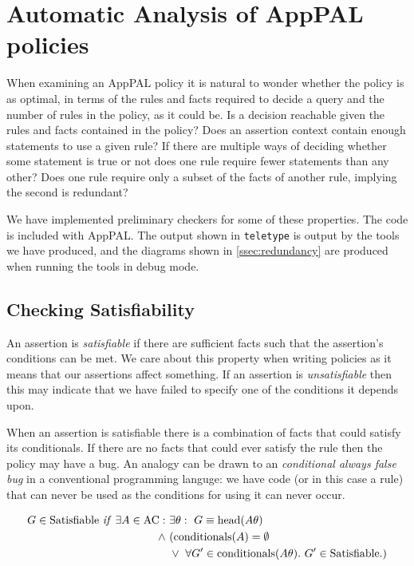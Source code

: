 \documentclass[thesis.tex]{subfiles}
\begin{document}
\section{Automatic Analysis of AppPAL policies}
\label{sec:lint}

When examining an AppPAL policy it is natural to wonder whether the
policy is as optimal, in terms of the rules and facts required to
decide a query and the number of rules in the policy, as it could
be. Is a decision reachable given the rules and facts contained in the
policy?  Does an assertion context contain enough statements to use a
given rule? If there are multiple ways of deciding whether some
statement is true or not does one rule require fewer statements than
any other? Does one rule require only a subset of the facts of another
rule, implying the second is redundant?

We have implemented preliminary checkers for some of these properties. The code
is included with AppPAL. The output shown in \texttt{teletype} is output by the
tools we have produced, and the diagrams shown in \autoref{ssec:redundancy} are
produced when running the tools in debug mode.


\subsection{Checking Satisfiability}

An assertion is \emph{satisfiable} if there are sufficient facts
such that the assertion's conditions can be met.  We care about this
property when writing policies as it means that our assertions affect
something.  If an assertion is \emph{unsatisfiable} then this may
indicate that we have failed to specify one of the conditions it
depends upon.

When an assertion is satisfiable there is a combination of facts that could
satisfy its conditionals. If there are no facts that could ever satisfy the rule
then the policy may have a bug. An analogy can be drawn to an \emph{conditional
always false bug} in a conventional programming languge: we have code (or in
this case a rule) that can never be used as the conditions for using it can
never occur.

\begin{align*}
  G \in \text{Satisfiable}~\text{\textit{if}}~\exists A \in \text{AC}:~&\exists \theta:~G\equiv\text{head}(A\theta) \\
                                                              \wedge~ & (\text{conditionals}(A) = \emptyset \\
                                                                      & \vee~\forall G^\prime \in \text{conditionals}(A\theta).~G^\prime \in \text{Satisfiable}.)
\end{align*}
\end{document}
